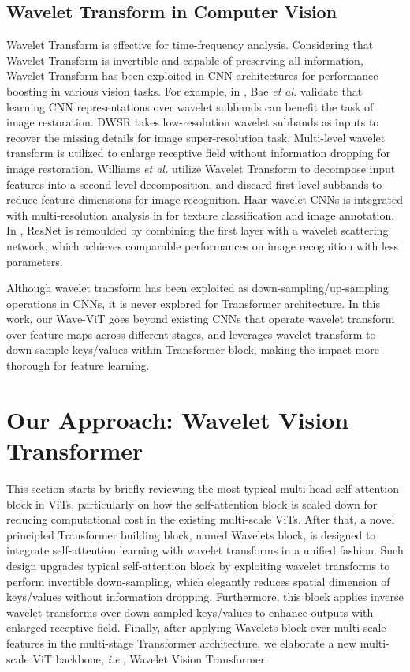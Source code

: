 \documentclass[runningheads]{llncs}
\begin{document}
\subsection{Wavelet Transform in Computer Vision}

Wavelet Transform is effective for time-frequency analysis. Considering that Wavelet Transform is invertible and capable of preserving all information, Wavelet Transform has been exploited in CNN architectures for performance boosting in various vision tasks. For example, in \cite{bae2017beyond}, Bae \emph{et al.} validate that learning CNN representations over wavelet subbands can benefit the task of image restoration. DWSR \cite{guo2017deep} takes low-resolution wavelet subbands as inputs to recover the missing details for image super-resolution task. Multi-level wavelet transform \cite{liu2018multi} is utilized to enlarge receptive field without information dropping for image restoration.
Williams \emph{et al.} \cite{williams2018wavelet} utilize Wavelet Transform to decompose input features into a second level decomposition, and discard first-level subbands to reduce feature dimensions for image recognition. Haar wavelet CNNs is integrated with multi-resolution analysis in \cite{fujieda2018wavelet} for texture classification and image annotation. In \cite{oyallon2017scaling}, ResNet is remoulded by combining the first layer with a wavelet scattering network, which achieves comparable performances on image recognition with less parameters.

Although wavelet transform has been exploited as down-sampling/up-sampling operations in CNNs, it is never explored for Transformer architecture.
In this work, our Wave-ViT goes beyond existing CNNs that operate wavelet transform over feature maps across different stages, and leverages wavelet transform to down-sample keys/values within Transformer block, making the impact more thorough for feature learning.






\section{Our Approach: Wavelet Vision Transformer}

This section starts by briefly reviewing the most typical multi-head self-attention block in ViTs, particularly on how the self-attention block is scaled down for reducing computational cost in the existing multi-scale ViTs. After that, a novel principled Transformer building block, named Wavelets block, is designed to integrate self-attention learning with wavelet transforms in a unified fashion. Such design upgrades typical self-attention block by exploiting wavelet transforms to perform invertible down-sampling, which elegantly reduces spatial dimension of keys/values without information dropping. Furthermore, this block applies inverse wavelet transforms over down-sampled keys/values to enhance outputs with enlarged receptive field. Finally, after applying Wavelets block over multi-scale features in the multi-stage Transformer architecture, we elaborate a new multi-scale ViT backbone, \emph{i.e.}, Wavelet Vision Transformer.
\end{document}
